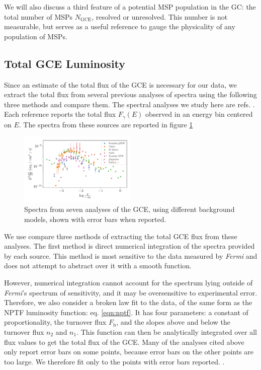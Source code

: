 \documentclass[a4paper,11pt]{article}
\newcommand{\comment}[1]{\emph{\color{red}{#1}}}
\begin{document}
We will also discuss a third feature of a potential MSP population in the GC: the total number of MSPs $N_\text{GCE}$, resolved or unresolved. This number is not measurable, but serves as a useful reference to gauge the physicality of any population of MSPs. \comment{Mention that it's expected to be around 40,000.}


\subsection{Total GCE Luminosity}
\label{sec:total-lum}
Since an estimate of the total flux of the GCE is necessary for our data, we extract the total flux from several previous analyses of spectra using the following three methods and compare them. The spectral analyses we study here are refs. \cite{Zhong:2019ycb, Calore:2014xka, DiMauro:2021raz, Abazajian:2014fta, Gordon, Ajello}. Each reference reports the total flux $F_\gamma(E)$ observed in an energy bin centered on $E$. The spectra from these sources are reported in figure \ref{fig:all-spectra}
\begin{figure}
    \centering
    \includegraphics[width=0.5\textwidth]{figs/all-spectra.pdf}
    \caption{Spectra from seven analyses of the GCE, using different background models, shown with error bars when reported.}
    \label{fig:all-spectra}
\end{figure}

\comment{Describe the sources: what's similar between them, what's different.}

We use compare three methods of extracting the total GCE flux from these analyses.
The first method is direct numerical integration of the spectra provided by each source. This method is most sensitive to the data measured by \textit{Fermi} and does not attempt to abstract over it with a smooth function.

However, numerical integration cannot account for the spectrum lying outside of \textit{Fermi}'s spectrum of sensitivity, and it may be oversensitive to experimental error. Therefore, we also consider a broken law fit to the data, of the same form as the NPTF luminosity function: eq. \ref{eqn:nptf}. It has four parameters: a constant of proportionality, the turnover flux $F_\text{b}$, and the slopes above and below the turnover flux $n_2$ and $n_1$. This function can then be analytically integrated over all flux values to get the total flux of the GCE. Many of the analyses cited above only report error bars on some points, because error bars on the other points are too large. We therefore fit only to the points with error bars reported. \comment{Mention the specific range fitted over}.
\end{document}
